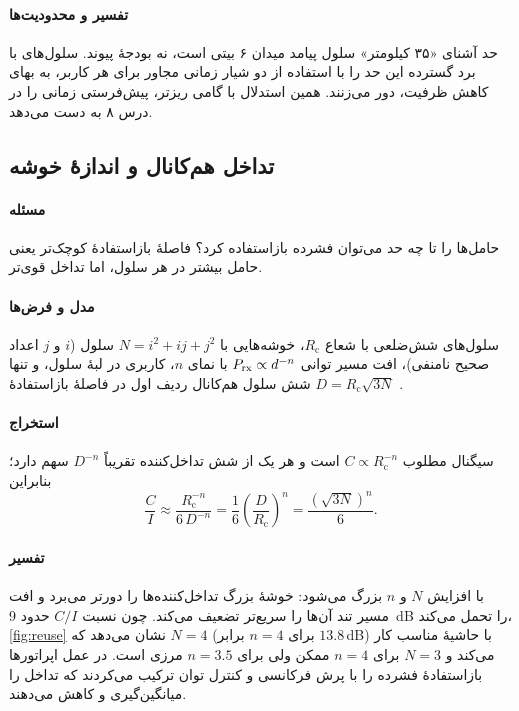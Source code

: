 \documentclass[11pt,a4paper]{article}
\begin{document}
\paragraph{تفسیر و محدودیت‌ها} حد آشنای «۳۵ کیلومتر» سلول  پیامد میدان ۶ بیتی
 است، نه بودجهٔ پیوند. سلول‌های با برد گسترده این حد را با استفاده از دو شیار
زمانی مجاور برای هر کاربر، به بهای کاهش ظرفیت، دور می‌زنند. همین استدلال با گامی ریزتر،
پیش‌فرستی زمانی  را در درس ۸ به دست می‌دهد.

\subsection{تداخل هم‌کانال و اندازهٔ خوشه}\label{sec:reuse}
\paragraph{مسئله} حامل‌ها را تا چه حد می‌توان فشرده بازاستفاده کرد؟ فاصلهٔ بازاستفادهٔ
کوچک‌تر یعنی حامل بیشتر در هر سلول، اما تداخل قوی‌تر.
\paragraph{مدل و فرض‌ها} سلول‌های شش‌ضلعی با شعاع $R_{\mathrm{c}}$، خوشه‌هایی با
$N = i^2 + ij + j^2$ سلول ($i$ و $j$ اعداد صحیح نامنفی)، افت مسیر توانی
$P_{\mathrm{rx}} \propto d^{-n}$ با نمای $n$، کاربری در لبهٔ سلول، و تنها شش سلول هم‌کانال ردیف اول
در فاصلهٔ بازاستفادهٔ $D = R_{\mathrm{c}}\sqrt{3N}$ \cite{rappaport2002wireless}.
\paragraph{استخراج} سیگنال مطلوب $C \propto R_{\mathrm{c}}^{-n}$ است و هر یک از شش تداخل‌کننده
تقریباً $D^{-n}$ سهم دارد؛ بنابراین
\begin{equation}\label{eq:ci}
  \frac{C}{I} \approx \frac{R_{\mathrm{c}}^{-n}}{6\,D^{-n}}
  = \frac{1}{6}\left(\frac{D}{R_{\mathrm{c}}}\right)^{n}
  = \frac{\left(\sqrt{3N}\right)^{n}}{6}.
\end{equation}
\paragraph{تفسیر}  با افزایش $N$ و $n$ بزرگ می‌شود: خوشهٔ بزرگ تداخل‌کننده‌ها
را دورتر می‌برد و افت مسیر تند آن‌ها را سریع‌تر تضعیف می‌کند. چون  نسبت $C/I$ حدود
\qty{9}{\dB} را تحمل می‌کند، \cref{fig:reuse} نشان می‌دهد که $N=4$ (برای $n=4$ برابر
$13.8$\,dB) با حاشیهٔ مناسب کار می‌کند و $N=3$ برای $n=4$ ممکن ولی برای $n=3.5$ مرزی است.
در عمل اپراتورها بازاستفادهٔ فشرده را با پرش فرکانسی و کنترل توان ترکیب می‌کردند که تداخل
را میانگین‌گیری و کاهش می‌دهند.
\end{document}
